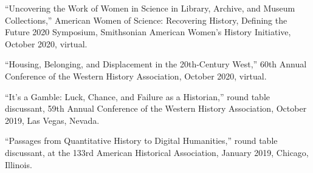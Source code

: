 ``Uncovering the Work of Women in Science in Library, Archive, and
Museum Collections,'' American Women of Science: Recovering History,
Defining the Future 2020 Symposium, Smithsonian American Women's History
Initiative, October 2020, virtual.

``Housing, Belonging, and Displacement in the 20th-Century West,'' 60th
Annual Conference of the Western History Association, October 2020,
virtual.

``It's a Gamble: Luck, Chance, and Failure as a Historian,'' round table
discussant, 59th Annual Conference of the Western History Association,
October 2019, Las Vegas, Nevada.

``Passages from Quantitative History to Digital Humanities,'' round
table discussant, at the 133rd American Historical Association, January
2019, Chicago, Illinois.
